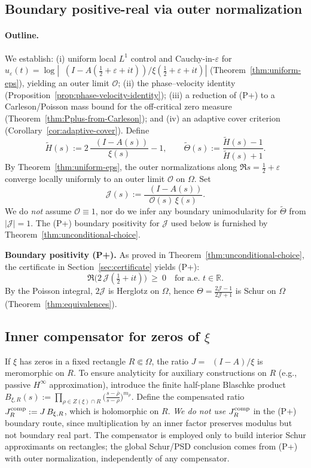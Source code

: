 \documentclass[11pt]{article}
\theoremstyle{definition}
\theoremstyle{remark}
\newcommand{\R}{\mathbb{R}}
\DeclareMathOperator{\dettwo}{det_2}
\begin{document}
\subsection{Boundary positive-real via outer normalization}\label{subsec:boundary-unitarity}
\paragraph{Outline.}
We establish: (i) uniform local $L^1$ control and Cauchy-in-$\varepsilon$ for $u_\varepsilon(t)=\log|\dettwo(I-A(\tfrac12+\varepsilon+it))/\xi(\tfrac12+\varepsilon+it)|$ (Theorem~\ref{thm:uniform-eps}), yielding an outer limit \(\mathcal O\); (ii) the phase--velocity identity (Proposition~\ref{prop:phase-velocity-identity}); (iii) a reduction of (P+) to a Carleson/Poisson mass bound for the off-critical zero measure (Theorem~\ref{thm:Pplus-from-Carleson}); and (iv) an adaptive cover criterion (Corollary~\ref{cor:adaptive-cover}).
Define
\[
 \widetilde H(s):=2\,\frac{\dettwo(I-A(s))}{\xi(s)}-1,\qquad
 \widetilde\Theta(s):=\frac{\widetilde H(s)-1}{\widetilde H(s)+1}.
\]
By Theorem~\ref{thm:uniform-eps}, the outer normalizations along \(\Re s=\tfrac12+\varepsilon\) converge locally uniformly to an outer limit \(\mathcal O\) on \(\Omega\). Set
\[
 \mathcal J(s):=\frac{\dettwo(I-A(s))}{\mathcal O(s)\,\xi(s)}.
\]
We do \emph{not} assume \(\mathcal O\equiv 1\), nor do we infer any boundary unimodularity for \(\widetilde\Theta\) from \(|\mathcal J|=1\). The (P+) boundary positivity for \(\mathcal J\) used below is furnished by Theorem~\ref{thm:unconditional-choice}.

\medskip
\noindent\textbf{Boundary positivity (P+).} As proved in Theorem~\ref{thm:unconditional-choice}, the certificate in Section~\ref{sec:certificate} yields (P+):
\[
 \Re\big(2\,\mathcal J(\tfrac12+it)\big)\ \ge\ 0\quad\text{for a.e. }t\in\R.
\]
By the Poisson integral, \(2\mathcal J\) is Herglotz on \(\Omega\), hence
\(\Theta=\frac{2\mathcal J-1}{2\mathcal J+1}\) is Schur on \(\Omega\) (Theorem~\ref{thm:equivalences}).

\subsection{Inner compensator for zeros of \(\xi\)}\label{subsec:bl-compensator}
If \(\xi\) has zeros in a fixed rectangle \(R\Subset\Omega\), the ratio \(J=\dettwo(I-A)/\xi\) is meromorphic on \(R\).
To ensure analyticity for auxiliary constructions on \(R\) (e.g., passive \(H^\infty\) approximation), introduce the finite half-plane Blaschke product
\(
 B_{\xi,R}(s):=\prod_{\rho\in Z(\xi)\cap R} \big(\tfrac{s-\overline \rho}{s-\rho}\big)^{m_\rho}.
\)
Define the compensated ratio \(J_R^{\rm comp}:=J\,B_{\xi,R}\), which is holomorphic on \(R\).
\emph{We do not use} \(J_R^{\rm comp}\) in the (P+) boundary route, since multiplication by an inner factor preserves modulus but not boundary real part. The compensator is employed only to build interior Schur approximants on rectangles; the global Schur/PSD conclusion comes from (P+) with outer normalization, independently of any compensator.
\end{document}
